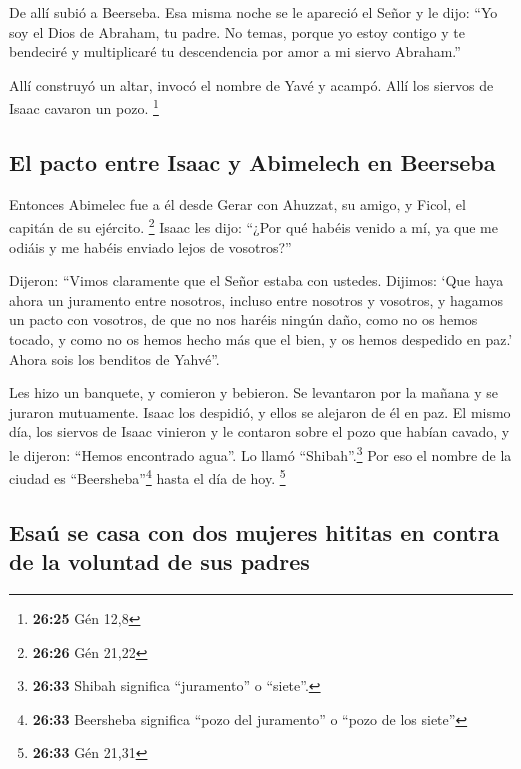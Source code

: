 \begin{paracol}{2}
 De allí subió a Beerseba.  Esa misma
noche se le apareció el Señor y le dijo: ``Yo soy el Dios de Abraham, tu
padre. No temas, porque yo estoy contigo y te bendeciré y multiplicaré
tu descendencia por amor a mi siervo Abraham.''

 Allí construyó un altar, invocó el nombre de Yavé y
acampó. Allí los siervos de Isaac cavaron un pozo. \footnote{\textbf{26:25}
  Gén 12,8}

\hypertarget{el-pacto-entre-isaac-y-abimelech-en-beerseba}{%
\subsection{El pacto entre Isaac y Abimelech en
Beerseba}\label{el-pacto-entre-isaac-y-abimelech-en-beerseba}}

 Entonces Abimelec fue a él desde Gerar con Ahuzzat, su
amigo, y Ficol, el capitán de su ejército. \footnote{\textbf{26:26} Gén
  21,22}  Isaac les dijo: ``¿Por qué habéis venido a mí,
ya que me odiáis y me habéis enviado lejos de vosotros?''

 Dijeron: ``Vimos claramente que el Señor estaba con
ustedes. Dijimos: `Que haya ahora un juramento entre nosotros, incluso
entre nosotros y vosotros, y hagamos un pacto con vosotros,
 de que no nos haréis ningún daño, como no os hemos
tocado, y como no os hemos hecho más que el bien, y os hemos despedido
en paz.' Ahora sois los benditos de Yahvé''.

 Les hizo un banquete, y comieron y bebieron.
 Se levantaron por la mañana y se juraron mutuamente.
Isaac los despidió, y ellos se alejaron de él en paz.  El
mismo día, los siervos de Isaac vinieron y le contaron sobre el pozo que
habían cavado, y le dijeron: ``Hemos encontrado agua''. 
Lo llamó ``Shibah''.\footnote{\textbf{26:33} Shibah significa
  ``juramento'' o ``siete''.} Por eso el nombre de la ciudad es
``Beersheba''\footnote{\textbf{26:33} Beersheba significa ``pozo del
  juramento'' o ``pozo de los siete''} hasta el día de hoy. \footnote{\textbf{26:33}
  Gén 21,31}

\hypertarget{esauxfa-se-casa-con-dos-mujeres-hititas-en-contra-de-la-voluntad-de-sus-padres}{%
\subsection{Esaú se casa con dos mujeres hititas en contra de la
voluntad de sus
padres}\label{esauxfa-se-casa-con-dos-mujeres-hititas-en-contra-de-la-voluntad-de-sus-padres}}


\end{paracol}
